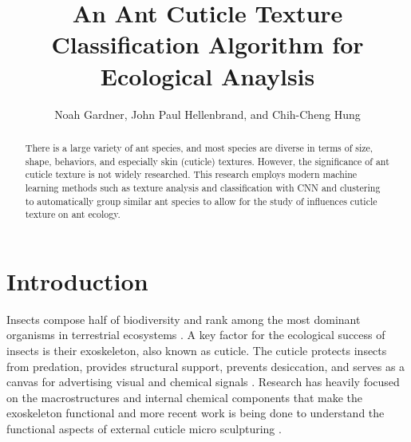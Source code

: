 \documentclass{aci}
\begin{document}
\title{An Ant Cuticle Texture Classification Algorithm for Ecological Anaylsis}

\author{%
  Noah Gardner, John Paul Hellenbrand, and Chih-Cheng
  Hung\corrauth}


\address{%
  }


\begin{abstract}
  There is a large variety of ant species, and most species are diverse in terms
  of size, shape, behaviors, and especially skin (cuticle) textures. However,
  the significance of ant cuticle texture is not widely researched. This
  research employs modern machine learning methods such as texture analysis and
  classification with CNN and clustering to automatically group similar ant
  species to allow for the study of influences cuticle texture on ant ecology.

\end{abstract}


\maketitle
\section{Introduction}
Insects compose half of biodiversity and rank among the most dominant organisms
in terrestrial ecosystems \cite{sheikh_diverse_2017}. A key factor for the
ecological success of insects is their exoskeleton, also known as cuticle. The
cuticle protects insects from predation, provides structural support, prevents
desiccation, and serves as a canvas for advertising visual and chemical signals
\cite{gullan_insects_2009}. Research has heavily focused on the macrostructures
and internal chemical components that make the exoskeleton functional and more
recent work is being done to understand the functional aspects of external
cuticle micro sculpturing \cite{muthukrishnan_insect_2020,
  gunderson_insect_1989, watson_diversity_2017}.
\end{document}
